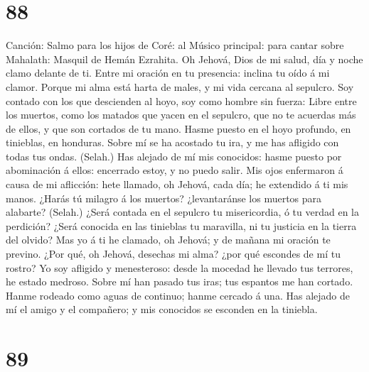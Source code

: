 \hypertarget{section-87}{%
\section{88}\label{section-87}}

 Canción: Salmo para los hijos de Coré: al Músico
principal: para cantar sobre Mahalath: Masquil de Hemán Ezrahita. Oh
Jehová, Dios de mi salud, día y noche clamo delante de ti.
 Entre mi oración en tu presencia: inclina tu oído á mi
clamor.  Porque mi alma está harta de males, y mi vida
cercana al sepulcro.  Soy contado con los que descienden
al hoyo, soy como hombre sin fuerza:  Libre entre los
muertos, como los matados que yacen en el sepulcro, que no te acuerdas
más de ellos, y que son cortados de tu mano.  Hasme puesto
en el hoyo profundo, en tinieblas, en honduras.  Sobre mí
se ha acostado tu ira, y me has afligido con todas tus ondas. (Selah.)
 Has alejado de mí mis conocidos: hasme puesto por
abominación á ellos: encerrado estoy, y no puedo salir. 
Mis ojos enfermaron á causa de mi aflicción: hete llamado, oh Jehová,
cada día; he extendido á ti mis manos.  ¿Harás tú milagro
á los muertos? ¿levantaránse los muertos para alabarte? (Selah.)
 ¿Será contada en el sepulcro tu misericordia, ó tu
verdad en la perdición?  ¿Será conocida en las tinieblas
tu maravilla, ni tu justicia en la tierra del olvido? 
Mas yo á ti he clamado, oh Jehová; y de mañana mi oración te previno.
 ¿Por qué, oh Jehová, desechas mi alma? ¿por qué escondes
de mí tu rostro?  Yo soy afligido y menesteroso: desde la
mocedad he llevado tus terrores, he estado medroso. 
Sobre mí han pasado tus iras; tus espantos me han cortado.
 Hanme rodeado como aguas de continuo; hanme cercado á
una.  Has alejado de mí el amigo y el compañero; y mis
conocidos se esconden en la tiniebla.

\hypertarget{section-88}{%
\section{89}\label{section-88}}

